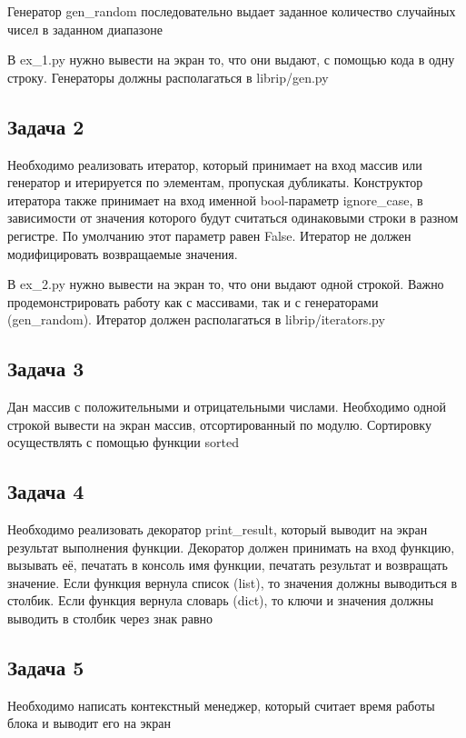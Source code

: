 \documentclass{article}
\begin{document}
Генератор gen\_random последовательно выдает заданное количество случайных чисел в заданном диапазоне

В ex\_1.py нужно вывести на экран то, что они выдают, с помощью кода в одну строку. Генераторы должны располагаться в librip/gen.py

\subsection{Задача 2}
Необходимо реализовать итератор, который принимает на вход массив или генератор и итерируется по элементам, пропуская дубликаты. Конструктор итератора также принимает на вход именной bool-параметр ignore\_case, в зависимости от значения которого будут считаться одинаковыми строки в разном регистре. По умолчанию этот параметр равен False. Итератор не должен модифицировать возвращаемые значения.

В ex\_2.py нужно вывести на экран то, что они выдают одной строкой. Важно продемонстрировать работу как с массивами, так и с генераторами (gen\_random).
Итератор должен располагаться в librip/iterators.py

\subsection{Задача 3}
Дан массив с положительными и отрицательными числами. Необходимо одной строкой вывести на экран массив, отсортированный по модулю. Сортировку осуществлять с помощью функции sorted

\subsection{Задача 4}
Необходимо реализовать декоратор print\_result, который выводит на экран результат выполнения функции.
Декоратор должен принимать на вход функцию, вызывать её, печатать в консоль имя функции, печатать результат и возвращать значение.
Если функция вернула список (list), то значения должны выводиться в столбик.
Если функция вернула словарь (dict), то ключи и значения должны выводить в столбик через знак равно

\subsection{Задача 5}
Необходимо написать контекстный менеджер, который считает время работы блока и выводит его на экран
\end{document}
